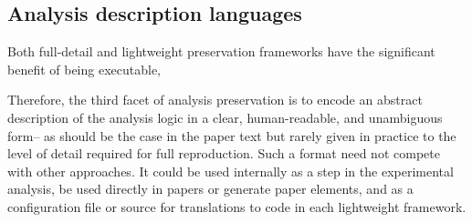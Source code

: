 \documentclass[11pt]{article}
\begin{document}






\subsection{Analysis description languages}

Both full-detail and lightweight preservation frameworks have the significant benefit of being executable, %

Therefore, the third facet of analysis preservation is to encode an abstract description of the analysis logic in a clear, human-readable, and unambiguous form-- as should be the case in the paper text but rarely given in practice to the level of detail required for full reproduction. Such a format need not compete with other approaches. It could be used internally as a step in the experimental analysis, be used directly in papers or generate paper elements, and as a configuration file or source for translations to code in each lightweight framework.
\end{document}
